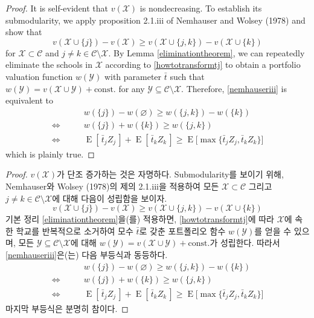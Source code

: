 \documentclass[11pt]{article} %
\theoremstyle{definition}
\theoremstyle{definition}
\begin{document}
\ifen
\begin{proof}
It is self-evident that $v(\mathcal{X})$ is nondecreasing. To establish its submodularity, we apply proposition 2.1.iii of Nemhauser and Wolsey (1978) and show that
\begin{equation}\label{nemhauseriii}
v(\mathcal{X} \cup \{j\}) - v(\mathcal{X}) \geq 
v(\mathcal{X} \cup \{j, k\}) - v(\mathcal{X} \cup \{k\})
\end{equation}
for $\mathcal{X} \subset \mathcal{C}$ and $j \neq k \in \mathcal{C} \setminus \mathcal{X}$. By Lemma \ref{eliminationtheorem}, we can repeatedly eliminate the schools in $\mathcal{X}$ according to \eqref{howtotransformtj} to obtain a portfolio valuation function $w(\mathcal{Y})$ with parameter $\bar t$ such that $w(\mathcal{Y}) = v(\mathcal{X} \cup \mathcal{Y}) + \text{const.}$ for any $\mathcal{Y} \subseteq \mathcal{C} \setminus \mathcal{X}$. Therefore, \eqref{nemhauseriii} is equivalent to
\begin{align}
& w(\{j\}) - w(\varnothing) \geq w(\{j, k\}) - w(\{k\}) \\
\iff \qquad &w(\{j\})  +  w(\{k\})  \geq w(\{j, k\})  \\
\iff \qquad &\operatorname{E}[\,\bar t_j Z_j\,] + \operatorname{E}[\,\bar t_k Z_k\,] 
\geq \operatorname{E}\bigl[\max\{ \bar t_j Z_j, \bar t_k Z_k \} \bigr]
\end{align}
which is plainly true. 
\end{proof}
\else
\begin{proof}
$v(\mathcal{X})$가 단조 증가하는 것은 자명하다. Submodularity를 보이기 위해, Nemhauser와 Wolsey (1978)의 제의 2.1.iii을 적용하여 모든 $\mathcal{X} \subset \mathcal{C}$ 그리고 $j \neq k \in \mathcal{C} \setminus \mathcal{X}$에 대해 다음이 성립함을 보이자. \begin{equation} v(\mathcal{X} \cup \{j\}) - v(\mathcal{X}) \geq 
v(\mathcal{X} \cup \{j, k\}) - v(\mathcal{X} \cup \{k\}) \label{nemhauseriii}
\end{equation}
기본 정리 \ref{eliminationtheorem}을(를) 적용하면, \eqref{howtotransformtj}에 따라 $\mathcal{X}$에 속한 학교를 반복적으로 소거하여 모수 $\bar t$로 갖춘 포트폴리오 함수 $w(\mathcal{Y})$를 얻을 수 있으며,  모든 $\mathcal{Y} \subseteq \mathcal{C} \setminus \mathcal{X}$에 대해 $w(\mathcal{Y}) = v(\mathcal{X} \cup \mathcal{Y}) + \text{const.}$가 성립한다. 따라서 \eqref{nemhauseriii}은(는) 다음 부등식과 동등하다.
\begin{align}
& w(\{j\}) - w(\varnothing) \geq w(\{j, k\}) - w(\{k\}) \\
\iff \qquad &w(\{j\})  +  w(\{k\})  \geq w(\{j, k\})  \\
\iff \qquad &\operatorname{E}[\,\bar t_j Z_j\,] + \operatorname{E}[\,\bar t_k Z_k\,] 
\geq \operatorname{E}\bigl[\max\{ \bar t_j Z_j, \bar t_k Z_k \} \bigr]
\end{align}
마지막 부등식은 분명히 참이다.
\end{proof}
\fi
\end{document}
